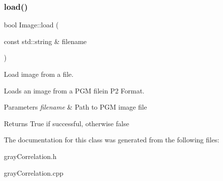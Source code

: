 \subsubsection{\texorpdfstring{load()}{load()}}
{\footnotesize\ttfamily bool Image\+::load (\begin{DoxyParamCaption}\item[{const std\+::string \&}]{filename }\end{DoxyParamCaption})}



Load image from a file. 

Loads an image from a P\+GM filein P2 Format.


\begin{DoxyParams}{Parameters}
{\em filename} & Path to P\+GM image file \\
\hline
\end{DoxyParams}
\begin{DoxyReturn}{Returns}
True if successful, otherwise false 
\end{DoxyReturn}


The documentation for this class was generated from the following files\+:\begin{DoxyCompactItemize}
\item 
gray\+Correlation.\+h\item 
gray\+Correlation.\+cpp\end{DoxyCompactItemize}
